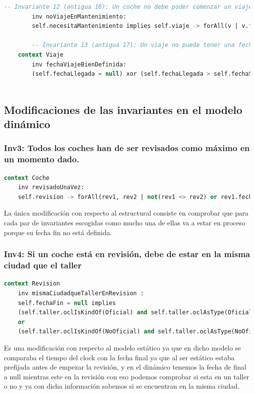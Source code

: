 \documentclass[12pt.a4paper]{article}
\begin{document}
\begin{lstlisting}[style = useNormal,language=SQL, caption={Codigo Use del apartado B}]
    -- Invariante 12 (antigua 16): Un coche no debe poder comenzar un viaje con la alerta de mantenimiento en true
        inv noViajeEnMantenimiento:
        self.necesitaMantenimiento implies self.viaje -> forAll(v | v.fechaLlegada <> null)
    
        -- Invariante 13 (antigua 17): Un viaje no puede tener una fecha de inicio superior a su fecha de llegada
    context Viaje
        inv fechaViajeBienDefinida:
        (self.fechaLlegada = null) xor (self.fechaLlegada > self.fechaSalida)
    
\end{lstlisting}

\subsection{Modificaciones de las invariantes en el modelo dinámico}

\subsubsection{Inv3: Todos los coches han de ser revisados como máximo en un momento dado.}
    \begin{lstlisting}[style = useEspecifico,language=SQL]
context Coche    
    inv revisadoUnaVez:
    self.revision -> forAll(rev1, rev2 | not(rev1 <> rev2) or rev1.fechaInicio <> rev2.fechaInicio and (rev1.fechaInicio >= rev2.fechaFin or rev2.fechaInicio >= rev1.fechaFin) and (not(rev1.fechaFin = null and rev2.fechaFin = null)))
    \end{lstlisting}
    La única modificación con respecto al estructural consiste en comprobar que para cada par de invariantes escogidas como mucho una de ellas va a estar en proceso porque su fecha fin no está definida.
\subsubsection{Inv4: Si un coche está en revisión, debe de estar en la misma ciudad que el taller}
    \begin{lstlisting}[style = useEspecifico,language=SQL]
context Revision
    inv mismaCiudadqueTallerEnRevision :
    self.fechaFin = null implies 
    (self.taller.oclIsKindOf(Oficial) and self.taller.oclAsType(Oficial).ciudad = self.coche.ciudad)
    or
    (self.taller.oclIsKindOf(NoOficial) and self.taller.oclAsType(NoOficial).ciudad = self.coche.ciudad)
    \end{lstlisting}
    Es una modificación con respecto al modelo estático ya que en dicho modelo se comparaba el tiempo del clock con la fecha final ya que al ser estático estaba prefijada antes de empezar la revisión, y en el dinámico tenemos la fecha de final a null mientras este en la revisión con eso podemos comprobar si esta en un taller o no y ya con dicha información sabemos si se encuentran en la misma ciudad.
\end{document}

